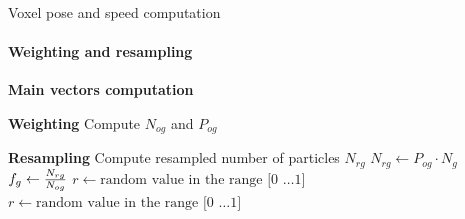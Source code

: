 \begin{frame}[plain]{Voxel pose and speed computation}
  \framesubtitle{Weighting and resampling}
  \begin{algorithm}[H]
  \tiny
  \begin{algorithmic}

      \Comment \textbf{Main vectors computation}
	\State {}

	\Comment \textbf{Weighting}
	\State \indent Compute $N_{og}$ and $P_{og}$

	\Comment \textbf{Resampling}
	\State \indent Compute resampled number of particles $N_{rg}$
	\State \indent $N_{rg} \gets P_{og} \cdot N_g$
	\State \indent $f_g \gets {{N_{rg}} \over {N_{og}}}$
	 
	   
	   
	  \EndFor
	  \State $r \gets \text{random value in the range [0 \ldots 1]}$
	  \EndIf
	\Else {}
	  \State $r \gets \text{random value in the range [0 \ldots 1]}$
	  \EndIf
	\EndIf
      \EndFor
    \EndFor
  \EndFunction
  \end{algorithmic}
  \end{algorithm}
  

\end{frame}
